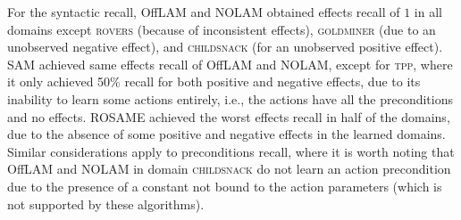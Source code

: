 \documentclass[letterpaper]{article} %
\newcommand{\nolam}{NOLAM\xspace}
\newcommand{\offlam}{OffLAM\xspace}
\newcommand{\rosame}{ROSAME\xspace}
\newcommand{\samshort}{SAM\xspace}
\newif\ifaddcomments
\newcommand{\roni}[1]{\ifaddcomments{\textcolor{red}{[Roni: #1]}}\fi}
\newcommand{\leo}[1]{\ifaddcomments{\textcolor{pink}{[Leonardo: #1]}}\fi}
\begin{document}
%
For the syntactic recall, \offlam and \nolam obtained effects recall of $1$ in all domains except \textsc{rovers} (because of inconsistent effects), \textsc{goldminer} (due to an unobserved negative effect), and \textsc{childsnack} (for an unobserved positive effect). \samshort achieved same effects recall of \offlam{} and \nolam, except for \textsc{tpp}, where it only achieved 50\% recall for both positive and negative effects, due to its inability to learn some actions entirely, i.e., the actions have all the preconditions and no effects. 
\rosame achieved the worst effects recall in half of the domains, due to the absence of some positive and negative effects in the learned domains.
Similar considerations apply to preconditions recall, where it is worth noting that \offlam and \nolam in domain \textsc{childsnack} do not learn an action precondition due to the presence of a constant not bound to the action parameters (which is not supported by these algorithms). 
\end{document}
